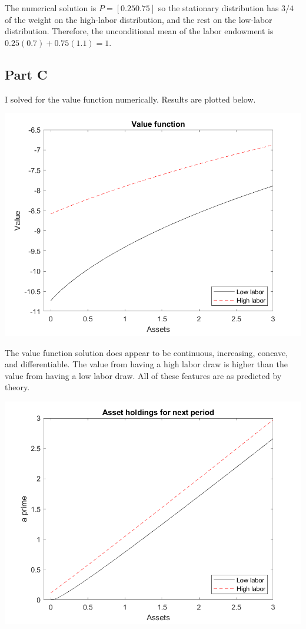 \documentclass[11pt]{article} %
\begin{document}
The numerical solution is $P = [0.25 0.75] $ so the stationary distribution has $3/4 $ of the weight on the high-labor distribution, and the rest on the low-labor distribution. Therefore, the unconditional mean of the labor endowment is $0.25(0.7) + 0.75(1.1) = 1$.

\subsection{Part C}
I solved for the value function numerically. Results are plotted below.

\includegraphics{valfunc}

The value function solution does appear to be continuous, increasing, concave, and differentiable. The value from having a high labor draw is higher than the value from having a low labor draw. All of these features are as predicted by theory.

\includegraphics{aprime}
\end{document}
